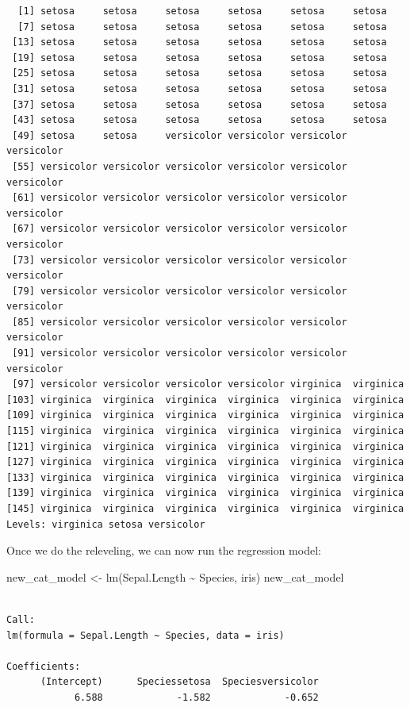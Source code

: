 \documentclass[
  letterpaper,
  DIV=11,
  numbers=noendperiod]{scrartcl}
\newenvironment{Shaded}{\begin{snugshade}}{\end{snugshade}}
\newcommand{\FunctionTok}[1]{\textcolor[rgb]{0.28,0.35,0.67}{#1}}
\newcommand{\NormalTok}[1]{\textcolor[rgb]{0.00,0.23,0.31}{#1}}
\newcommand{\OtherTok}[1]{\textcolor[rgb]{0.00,0.23,0.31}{#1}}
\newcommand{\SpecialCharTok}[1]{\textcolor[rgb]{0.37,0.37,0.37}{#1}}
\begin{document}
\begin{verbatim}
  [1] setosa     setosa     setosa     setosa     setosa     setosa    
  [7] setosa     setosa     setosa     setosa     setosa     setosa    
 [13] setosa     setosa     setosa     setosa     setosa     setosa    
 [19] setosa     setosa     setosa     setosa     setosa     setosa    
 [25] setosa     setosa     setosa     setosa     setosa     setosa    
 [31] setosa     setosa     setosa     setosa     setosa     setosa    
 [37] setosa     setosa     setosa     setosa     setosa     setosa    
 [43] setosa     setosa     setosa     setosa     setosa     setosa    
 [49] setosa     setosa     versicolor versicolor versicolor versicolor
 [55] versicolor versicolor versicolor versicolor versicolor versicolor
 [61] versicolor versicolor versicolor versicolor versicolor versicolor
 [67] versicolor versicolor versicolor versicolor versicolor versicolor
 [73] versicolor versicolor versicolor versicolor versicolor versicolor
 [79] versicolor versicolor versicolor versicolor versicolor versicolor
 [85] versicolor versicolor versicolor versicolor versicolor versicolor
 [91] versicolor versicolor versicolor versicolor versicolor versicolor
 [97] versicolor versicolor versicolor versicolor virginica  virginica 
[103] virginica  virginica  virginica  virginica  virginica  virginica 
[109] virginica  virginica  virginica  virginica  virginica  virginica 
[115] virginica  virginica  virginica  virginica  virginica  virginica 
[121] virginica  virginica  virginica  virginica  virginica  virginica 
[127] virginica  virginica  virginica  virginica  virginica  virginica 
[133] virginica  virginica  virginica  virginica  virginica  virginica 
[139] virginica  virginica  virginica  virginica  virginica  virginica 
[145] virginica  virginica  virginica  virginica  virginica  virginica 
Levels: virginica setosa versicolor
\end{verbatim}

Once we do the releveling, we can now run the regression model:

\begin{Shaded}
\begin{Highlighting}[]
\NormalTok{new\_cat\_model }\OtherTok{\textless{}{-}} \FunctionTok{lm}\NormalTok{(Sepal.Length }\SpecialCharTok{\textasciitilde{}}\NormalTok{ Species, iris)}
\NormalTok{new\_cat\_model}
\end{Highlighting}
\end{Shaded}

\begin{verbatim}

Call:
lm(formula = Sepal.Length ~ Species, data = iris)

Coefficients:
      (Intercept)      Speciessetosa  Speciesversicolor  
            6.588             -1.582             -0.652  
\end{verbatim}
\end{document}
